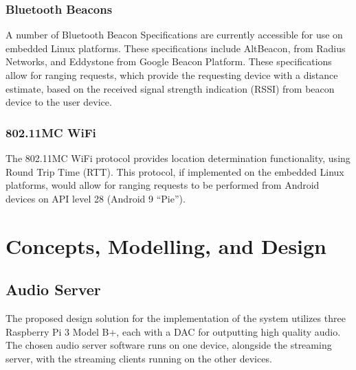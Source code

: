\documentclass[11pt,a4paper,headinclude=false,footinclude=false]{scrreprt}
\begin{document}
\subsection{Bluetooth Beacons}\label{bluetooth-beacons}

A number of Bluetooth Beacon Specifications are currently accessible for
use on embedded Linux platforms. These specifications include
AltBeacon\cite{altbeacon}, from Radius Networks, and
Eddystone\cite{eddystone} from Google Beacon Platform. These
specifications allow for ranging requests, which provide the requesting
device with a distance estimate, based on the received signal strength
indication (RSSI) from beacon device to the user device.

\subsection{802.11MC WiFi}\label{mc-wifi}

The 802.11MC WiFi protocol provides location determination
functionality, using Round Trip Time (RTT). This protocol, if
implemented on the embedded Linux platforms, would allow for ranging
requests to be performed from Android devices on API level 28 (Android 9
``Pie'')\cite{droidRTT}.

\chapter{Concepts, Modelling, and
Design}\label{concepts-modelling-and-design}

\section{Audio Server}\label{audio-server}

The proposed design solution for the implementation of the system
utilizes three Raspberry Pi 3 Model B+, each with a DAC for outputting
high quality audio. The chosen audio server software runs on one device,
alongside the streaming server, with the streaming clients running on
the other devices.
\end{document}
